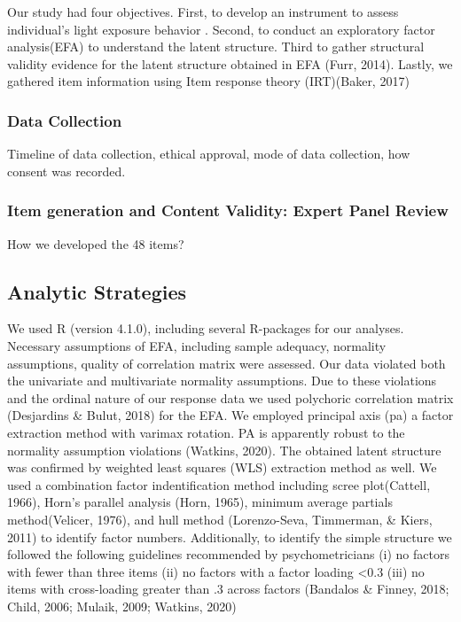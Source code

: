 \documentclass[
  english,
  man]{apa6}
\begin{document}
Our study had four objectives. First, to develop an instrument to assess individual's light exposure behavior . Second, to conduct an exploratory factor analysis(EFA) to understand the latent structure. Third to gather structural validity evidence for the latent structure obtained in EFA (Furr, 2014). Lastly, we gathered item information using Item response theory (IRT)(Baker, 2017)

\hypertarget{data-collection}{%
\subsubsection{Data Collection}\label{data-collection}}

Timeline of data collection, ethical approval, mode of data collection, how consent was recorded.

\hypertarget{item-generation-and-content-validity-expert-panel-review}{%
\subsubsection{Item generation and Content Validity: Expert Panel Review}\label{item-generation-and-content-validity-expert-panel-review}}

How we developed the 48 items?

\hypertarget{analytic-strategies}{%
\subsection{Analytic Strategies}\label{analytic-strategies}}

We used R (version 4.1.0), including several R-packages for our analyses. Necessary assumptions of EFA, including sample adequacy, normality assumptions, quality of correlation matrix were assessed. Our data violated both the univariate and multivariate normality assumptions. Due to these violations and the ordinal nature of our response data we used polychoric correlation matrix (Desjardins \& Bulut, 2018) for the EFA. We employed principal axis (pa) a factor extraction method with varimax rotation. PA is apparently robust to the normality assumption violations (Watkins, 2020). The obtained latent structure was confirmed by weighted least squares (WLS) extraction method as well. We used a combination factor indentification method including scree plot(Cattell, 1966), Horn's parallel analysis (Horn, 1965), minimum average partials method(Velicer, 1976), and hull method (Lorenzo-Seva, Timmerman, \& Kiers, 2011) to identify factor numbers. Additionally, to identify the simple structure we followed the following guidelines recommended by psychometricians (i) no factors with fewer than three items (ii) no factors with a factor loading \textless0.3 (iii) no items with cross-loading greater than .3 across factors (Bandalos \& Finney, 2018; Child, 2006; Mulaik, 2009; Watkins, 2020)
\end{document}
